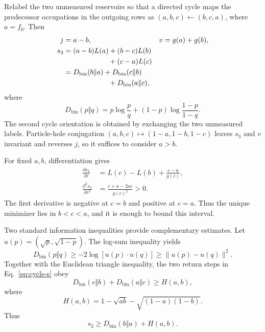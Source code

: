 \documentclass[aps,pra,reprint,superscriptaddress,nofootinbib,longbibliography,floatfix]{revtex4-2}
\newcommand{\Dkl}{D_{\mathrm{bin}}}
\begin{document}
Relabel the two unmeasured reservoirs so that a directed cycle maps the predecessor occupations in the outgoing rows as $(a,b,c)\leftarrow(b,c,a)$, where $a=f_0$.  Then
\begin{align}
 j&=a-b,&v&=g(a)+g(b),\label{eq:cycle-jv}\\
 s_3&=(a-b)L(a)+(b-c)L(b)\nonumber\\
 &\hspace{2.2cm}+(c-a)L(c)\nonumber\\
 &=\Dkl(b\Vert a)+\Dkl(c\Vert b)\nonumber\\
 &\hspace{2.2cm}+\Dkl(a\Vert c),
 \label{eq:cycle-s}
\end{align}
where
\begin{equation}
 \Dkl(p\Vert q)=p\log\frac pq+(1-p)\log\frac{1-p}{1-q}.
\end{equation}
The second cycle orientation is obtained by exchanging the two unmeasured labels.  Particle-hole conjugation $(a,b,c)\mapsto(1-a,1-b,1-c)$ leaves $s_3$ and $v$ invariant and reverses $j$, so it suffices to consider $a>b$.

For fixed $a,b$, differentiation gives
\begin{align}
 \frac{\partial s_3}{\partial c}
 &=L(c)-L(b)+\frac{c-a}{g(c)},\label{eq:dc}\\
 \frac{\partial^2s_3}{\partial c^2}
 &=\frac{c+a-2ac}{g(c)^2}>0.
 \label{eq:d2c}
\end{align}
The first derivative is negative at $c=b$ and positive at $c=a$.  Thus the unique minimizer lies in $b<c<a$, and it is enough to bound this interval.

Two standard information inequalities provide complementary estimates.  Let $u(p)=(\sqrt p,\sqrt{1-p})$.  The log-sum inequality yields
\begin{equation}
 \Dkl(p\Vert q)\geq-2\log[u(p)\cdot u(q)]
 \geq\|u(p)-u(q)\|^2.
\end{equation}
Together with the Euclidean triangle inequality, the two return steps in Eq.~\eqref{eq:cycle-s} obey
\begin{equation}
 \Dkl(c\Vert b)+\Dkl(a\Vert c)\geq
 H(a,b),
 \label{eq:hellinger}
\end{equation}
where
\begin{equation}
 H(a,b)=1-\sqrt{ab}-\sqrt{(1-a)(1-b)}.
\end{equation}
Thus
\begin{equation}
 s_3\geq \Dkl(b\Vert a)+H(a,b).
 \label{eq:surrogate}
\end{equation}
\end{document}
